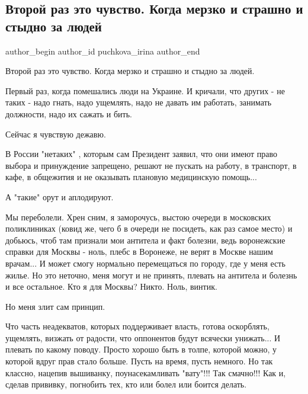  
 
 
 
 
 
\subsection{Второй раз это чувство. Когда мерзко и страшно и стыдно за людей}
\label{sec:24_06_2021.fb.puchkova_irina.1.ludi}
 
\ifcmt
 author_begin
   author_id puchkova_irina
 author_end
\fi

Второй раз это чувство. Когда мерзко и страшно и стыдно за людей. 

Первый раз, когда помешались люди на Украине. И кричали, что других - не таких
- надо гнать, надо ущемлять, надо не давать им работать, занимать должности,
надо их сажать и бить.

Сейчас я чувствую дежавю.

В России "нетаких" , которым сам Президент заявил, что они имеют право выбора и
принуждение запрещено, решают не пускать на работу, в транспорт, в кафе, в
общежития и не оказывать плановую медицинскую помощь...

А "такие" орут и аплодируют.

Мы переболели. Хрен сним, я заморочусь, выстою очереди в московских
поликлиниках (ковид же, чего б в очереди не посидеть, как раз самое место) и
добьюсь, чтоб там признали мои антитела и факт болезни, ведь воронежские
справки для Москвы - ноль, плебс в Воронеже, не верят в Москве нашим
врачам... И может смогу нормально перемещаться по городу, где у меня есть
жилье. Но это неточно, меня могут и не принять, плевать на антитела и болезнь
и все остальное. Кто я для Москвы? Никто. Ноль, винтик. 

Но меня злит сам принцип.

Что часть неадекватов, которых поддерживает власть, готова оскорблять,
ущемлять, визжать от радости, что оппонентов будут всячески унижать... И
плевать по какому поводу. Просто хорошо быть в толпе, которой можно, у которой
вдруг прав стало больше. Пусть на время, пусть немного. Но так классно,
нацепив вышиванку, поунасекамливать "вату"!!! Так смачно!!! Как и, сделав
прививку, погнобить тех, кто или болел или боится делать. 


